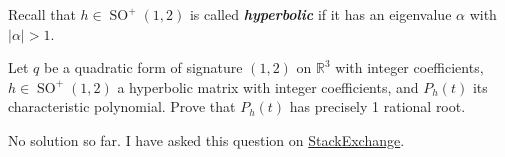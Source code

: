 \documentclass{article}
\newcommand{\R}{\mathbb{R}}
\DeclareMathOperator{\SO}{SO}
\begin{document}
\begin{remark}
	Recall that $h \in \SO^+(1, 2)$ is called \textbf{\textit{hyperbolic}} if it has an eigenvalue $\alpha$ with $|\alpha| > 1$.
\end{remark}
\begin{exercise}
	Let $q$ be a quadratic form of signature $(1,2)$ on $\R^3$ with integer coefficients, $h \in \SO^+(1,2)$ a hyperbolic matrix with integer coefficients, and $P_h(t)$ its characteristic polynomial. Prove that $P_h(t)$ has precisely 1 rational root.
\end{exercise}
	No solution so far.
	I have asked this question on \href{https://math.stackexchange.com/questions/4911600/hyperbolic-isometry-must-have-precisely-one-rational-eigenvalue?noredirect=1#comment10486659_4911600}{StackExchange}.
\printbibliography
\end{document}
